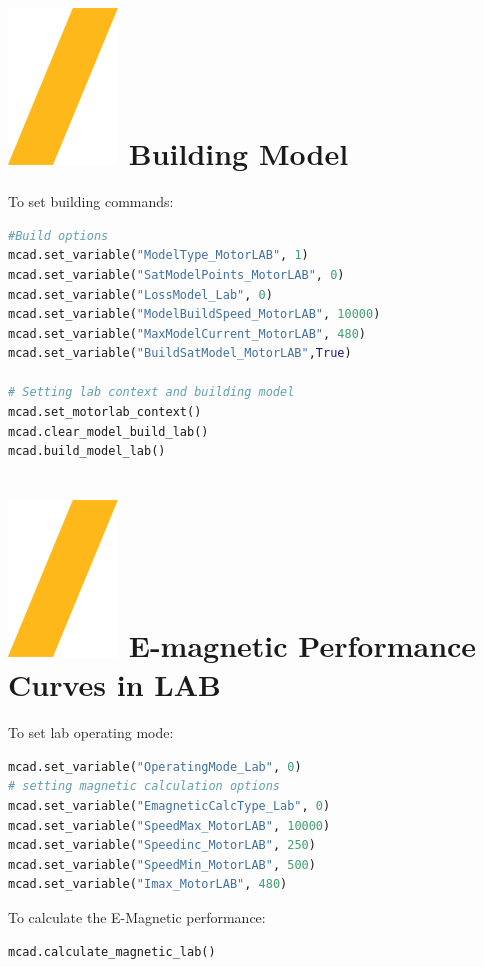 \documentclass[landscape]{article}
\begin{document}
\begin{multicols}{3}
\section{\includegraphics[height=\fontcharht\font`\S]{slash.png} Building Model}
To set building commands:
\begin{lstlisting}[language=Python]
#Build options
mcad.set_variable("ModelType_MotorLAB", 1)
mcad.set_variable("SatModelPoints_MotorLAB", 0)
mcad.set_variable("LossModel_Lab", 0)
mcad.set_variable("ModelBuildSpeed_MotorLAB", 10000)
mcad.set_variable("MaxModelCurrent_MotorLAB", 480)
mcad.set_variable("BuildSatModel_MotorLAB",True)

# Setting lab context and building model
mcad.set_motorlab_context()
mcad.clear_model_build_lab()
mcad.build_model_lab()
\end{lstlisting}
\section{\includegraphics[height=\fontcharht\font`\S]{slash.png} E-magnetic Performance Curves in LAB}
To set lab operating mode:
\begin{lstlisting}[language=Python]
mcad.set_variable("OperatingMode_Lab", 0)
# setting magnetic calculation options
mcad.set_variable("EmagneticCalcType_Lab", 0)
mcad.set_variable("SpeedMax_MotorLAB", 10000)
mcad.set_variable("Speedinc_MotorLAB", 250)
mcad.set_variable("SpeedMin_MotorLAB", 500)
mcad.set_variable("Imax_MotorLAB", 480)	
\end{lstlisting}
To calculate the E-Magnetic performance:
\begin{lstlisting}[language=Python]
mcad.calculate_magnetic_lab()
\end{lstlisting}


\end{multicols}
\end{document}
